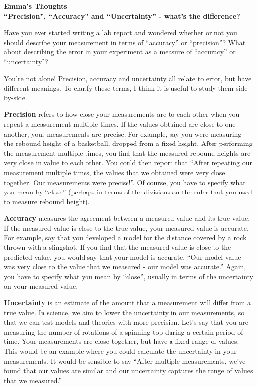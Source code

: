 \begin{framed}
\textbf{Emma's Thoughts}\\
\textbf{``Precision'', ``Accuracy'' and ``Uncertainty'' - what's the difference?}

Have you ever started writing a lab report and wondered whether or not you should describe your measurement in terms of ``accuracy'' or ``precision''? What about describing the error in your experiment as a measure of ``accuracy'' or ``uncertainty''?

You're not alone! Precision, accuracy and uncertainty all relate to error, but have different meanings. To clarify these terms, I think it is useful to study them side-by-side.

\textbf{Precision} refers to how close your measurements are to each other when you repeat a measurement multiple times. If the values obtained are close to one another, your measurements are precise. For example, say you were measuring the rebound height of a basketball, dropped from a fixed height. After performing the measurement multiple times, you find that the measured rebound heights are very close in value to each other. You could then report that ``After repeating our measurement multiple times, the values that we obtained were very close together. Our measurements were precise!''. Of course, you have to specify what you mean by ``close'' (perhaps in terms of the divisions on the ruler that you used to measure rebound height).

\textbf{Accuracy} measures the agreement between a measured value and its true value. If the measured value is close to the true value, your measured value is accurate. For example, say that you developed a model for the distance covered by a rock thrown with a slingshot. If you find that the measured value is close to the predicted value, you would say that your model is accurate, ``Our model value was very close to the value that we measured - our model was accurate.'' Again, you have to specify what you mean by ``close'', usually in terms of the uncertainty on your measured value.

\textbf{Uncertainty} is an estimate of the amount that a measurement will differ from a true value. In science, we aim to lower the uncertainty in our measurements, so that we can test models and theories with more precision. Let's say that you are measuring the number of rotations of a spinning top during a certain period of time. Your measurements are close together, but have a fixed range of values. This would be an example where you could calculate the uncertainty in your measurements. It would be sensible to say ``After multiple measurements, we've found that our values are similar and our uncertainty captures the range of values that we measured.''
\end{framed}

